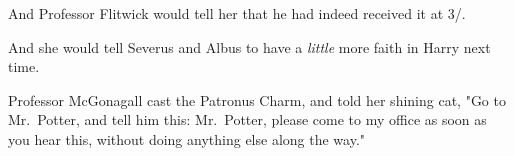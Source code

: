 And Professor Flitwick would tell her that he had indeed received it at 3\PM/.

And she would tell Severus and Albus to have a \emph{little} more faith in
Harry next time.

Professor McGonagall cast the Patronus Charm, and told her shining cat, "Go to
Mr.~Potter, and tell him this: Mr.~Potter, please come to my office as soon as
you hear this, without doing anything else along the way."
